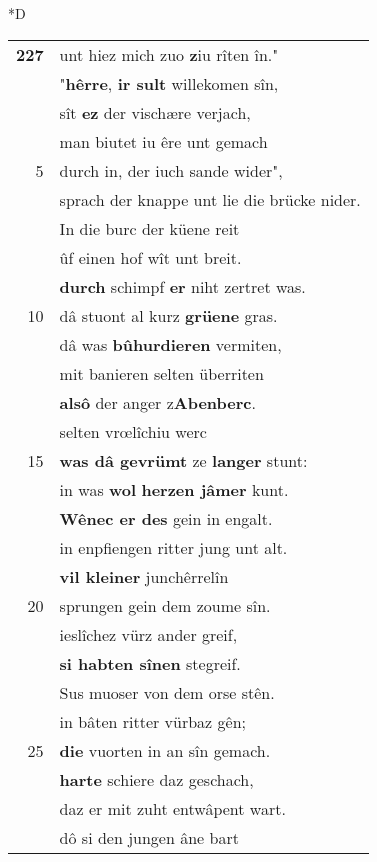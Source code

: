 \documentclass[8pt,a4paper,notitlepage]{article}
\begin{document}
\begin{table}[ht]
\begin{minipage}[t]{0.5\linewidth}
\small
\begin{center}*D
\end{center}
\begin{tabular}{rl}
\textbf{227} & unt hiez mich zuo \textbf{z}iu rîten în."\\ 
 & "\textbf{hêrre}, \textbf{ir sult} willekomen sîn,\\ 
 & sît \textbf{ez} der vischære verjach,\\ 
 & man biutet iu êre unt gemach\\ 
5 & durch in, der iuch sande wider",\\ 
 & sprach der knappe unt lie die brücke nider.\\ 
 & In die burc der küene reit\\ 
 & ûf einen hof wît unt breit.\\ 
 & \textbf{durch} schimpf \textbf{er} niht zertret was.\\ 
10 & dâ stuont al kurz \textbf{grüene} gras.\\ 
 & dâ was \textbf{bûhurdieren} vermiten,\\ 
 & mit banieren selten überriten\\ 
 & \textbf{alsô} der anger z\textbf{Abenberc}.\\ 
 & selten vrœlîchiu werc\\ 
15 & \textbf{was dâ gevrümt} ze \textbf{langer} stunt:\\ 
 & in was \textbf{wol} \textbf{herzen jâmer} kunt.\\ 
 & \textbf{Wênec er des} gein in engalt.\\ 
 & in enpfiengen ritter jung unt alt.\\ 
 & \textbf{vil kleiner} junchêrrelîn\\ 
20 & sprungen gein dem zoume sîn.\\ 
 & ieslîchez vürz ander greif,\\ 
 & \textbf{si habten sînen} stegreif.\\ 
 & Sus muoser von dem orse stên.\\ 
 & in bâten ritter vürbaz gên;\\ 
25 & \textbf{die} vuorten in an sîn gemach.\\ 
 & \textbf{harte} schiere daz geschach,\\ 
 & daz er mit zuht entwâpent wart.\\ 
 & dô si den jungen âne bart\\ 

\end{tabular}
\end{minipage}
\end{table}
\end{document}
